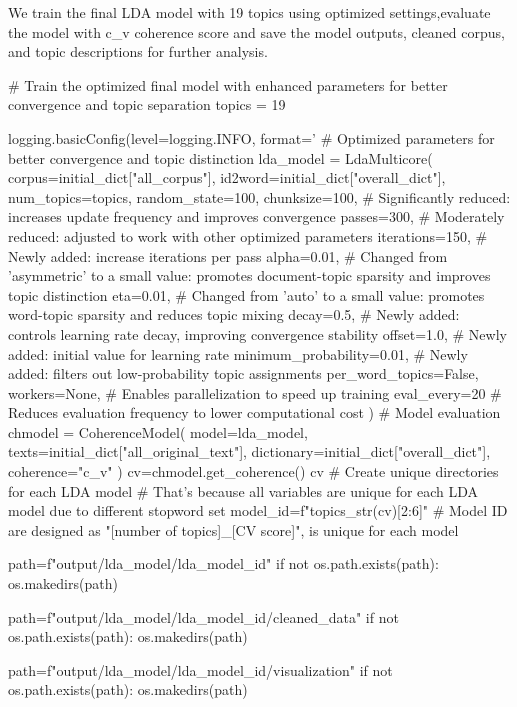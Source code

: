 \documentclass[12pt]{article}
\begin{document}
	We train the final LDA model with 19 topics using optimized settings,evaluate the model with c\_v coherence score and save the model outputs, cleaned corpus, and topic descriptions for further analysis.
	\begin{python}
# Train the optimized final model with enhanced parameters for better convergence and topic separation
topics = 19

logging.basicConfig(level=logging.INFO, format='%
# Optimized parameters for better convergence and topic distinction
lda_model = LdaMulticore(
    corpus=initial_dict["all_corpus"],
    id2word=initial_dict["overall_dict"],
    num_topics=topics,
    random_state=100,
    chunksize=100,           # Significantly reduced: increases update frequency and improves convergence
    passes=300,              # Moderately reduced: adjusted to work with other optimized parameters
    iterations=150,          # Newly added: increase iterations per pass
    alpha=0.01,              # Changed from 'asymmetric' to a small value: promotes document-topic sparsity and improves topic distinction
    eta=0.01,                # Changed from 'auto' to a small value: promotes word-topic sparsity and reduces topic mixing
    decay=0.5,               # Newly added: controls learning rate decay, improving convergence stability
    offset=1.0,              # Newly added: initial value for learning rate
    minimum_probability=0.01, # Newly added: filters out low-probability topic assignments
    per_word_topics=False,
    workers=None,            # Enables parallelization to speed up training
    eval_every=20            # Reduces evaluation frequency to lower computational cost
)
# Model evaluation
chmodel = CoherenceModel(
        model=lda_model,
        texts=initial_dict["all_original_text"],
        dictionary=initial_dict["overall_dict"],
        coherence="c_v"
    )
cv=chmodel.get_coherence()
cv
# Create unique directories for each LDA model
# That's because all variables are unique for each LDA model due to different stopword set
model_id=f"{topics}_{str(cv)[2:6]}"
# Model ID are designed as "[number of topics]_[CV score]", is unique for each model

path=f"output/lda_model/lda_{model_id}"
if not os.path.exists(path):
    os.makedirs(path)

path=f"output/lda_model/lda_{model_id}/cleaned_data"
if not os.path.exists(path):
    os.makedirs(path)

path=f"output/lda_model/lda_{model_id}/visualization"
if not os.path.exists(path):
    os.makedirs(path)


\end{python}
\end{document}

